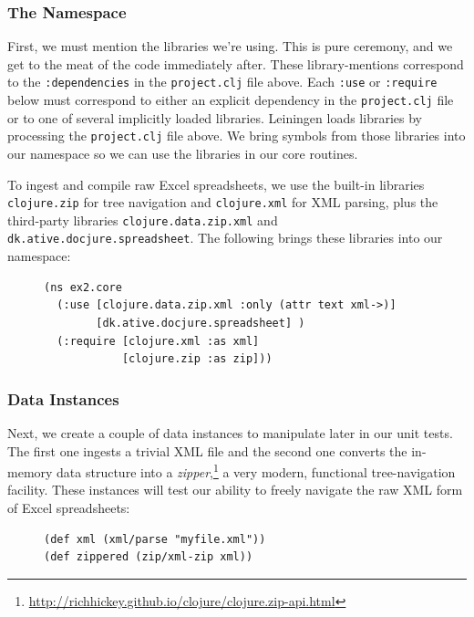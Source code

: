 \documentclass[11pt]{article}
\begin{document}
\subsubsection{The Namespace}
\label{sec-2-3-1}
First, we must mention the libraries we're using. This is pure
ceremony, and we get to the meat of the code immediately after. These
library-mentions correspond to the \verb|:dependencies| in the
\verb|project.clj| file above. Each \verb|:use| or \verb|:require|
below must correspond to either an explicit dependency in the
\verb|project.clj| file or to one of several implicitly loaded
libraries. Leiningen loads libraries by processing the
\verb|project.clj| file above. We bring symbols from those libraries
into our namespace so we can use the libraries in our core routines.

To ingest and compile raw Excel spreadsheets, we use the built-in
libraries \verb|clojure.zip| for tree navigation and
\verb|clojure.xml| for XML parsing, plus the third-party libraries
\verb|clojure.data.zip.xml| and \verb|dk.ative.docjure.spreadsheet|.
The following brings these libraries into our namespace:
\begin{figure}[H]
\label{main-namespace}
\begin{verbatim}
(ns ex2.core
  (:use [clojure.data.zip.xml :only (attr text xml->)]
        [dk.ative.docjure.spreadsheet] )
  (:require [clojure.xml :as xml]
            [clojure.zip :as zip]))
\end{verbatim}
\end{figure}
\subsubsection{Data Instances}
\label{sec-2-3-2}
Next, we create a couple of data instances to manipulate later in our
unit tests. The first one ingests a trivial XML file and the second
one converts the in-memory data structure into a
\emph{zipper},\footnote{\url{http://richhickey.github.io/clojure/clojure.zip-api.html}}
a very modern, functional tree-navigation facility. These instances
will test our ability to freely navigate the raw XML form of Excel
spreadsheets:
\begin{figure}[H]
\label{main-zippered}
\begin{verbatim}
(def xml (xml/parse "myfile.xml"))
(def zippered (zip/xml-zip xml))
\end{verbatim}
\end{figure}
\end{document}
